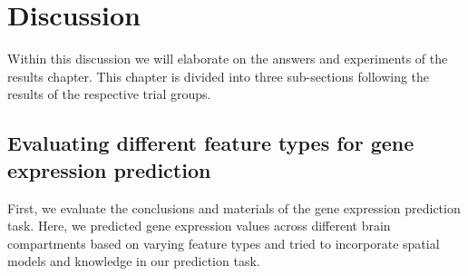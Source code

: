 \documentclass[]{article}
\begin{document}





\newpage
\section{Discussion}
\label{sec:discussion}

Within this discussion we will elaborate on the answers and experiments of the results chapter. This chapter is divided into three sub-sections following the results of the respective trial groups. 

\subsection{Evaluating different feature types for gene expression prediction}
\label{sec:disc_genexp}
First, we evaluate the conclusions and materials of the gene expression prediction task. Here, we predicted gene expression values across different brain compartments based on varying feature types and tried to incorporate spatial models and knowledge in our prediction task. \\
\end{document}
